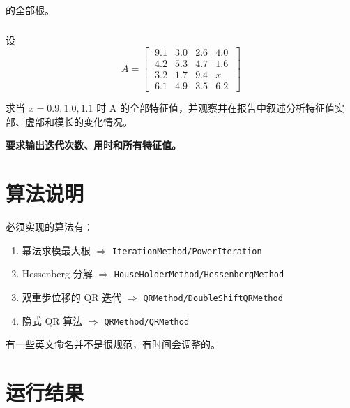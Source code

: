 \documentclass{article}
\begin{document}
的全部根。

\subsubsection{}
设
\[
    A=\begin{bmatrix}
    \;9.1 & 3.0 & 2.6 & 4.0 \;\\
    \;4.2 & 5.3 & 4.7 & 1.6 \;\\
    \;3.2 & 1.7 & 9.4 & x \;\\
    \;6.1 & 4.9 & 3.5 & 6.2\;
    \end{bmatrix}
\]

求当 $x = 0.9, 1.0, 1.1$ 时 A 的全部特征值，并观察并在报告中叙述分析特征值实部、虚部和模长的变化情况。

\textbf{要求输出迭代次数、用时和所有特征值。}

\section{算法说明}

必须实现的算法有：

\begin{enumerate}
    \item 幂法求模最大根 $\Rightarrow$ \verb|IterationMethod/PowerIteration|
    \item Hessenberg 分解 $\Rightarrow$ \verb|HouseHolderMethod/HessenbergMethod|
    \item 双重步位移的 QR 迭代 $\Rightarrow$ \verb|QRMethod/DoubleShiftQRMethod|
    \item 隐式 QR 算法 $\Rightarrow$ \verb|QRMethod/QRMethod|
\end{enumerate}

有一些英文命名并不是很规范，有时间会调整的。

\section{运行结果}



\newpage
\end{document}
